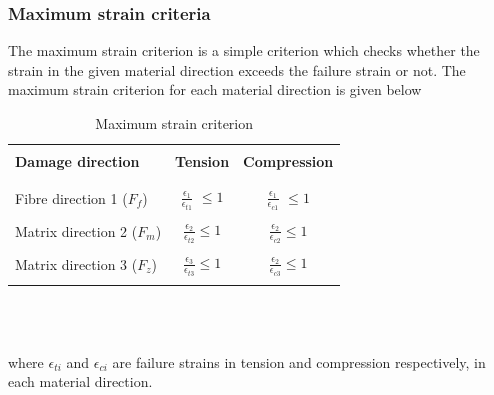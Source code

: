 \documentclass[a4paper,12pt]{extarticle}
\begin{document}
\subsubsection{Maximum strain criteria}
\indent\indent\indent The maximum strain criterion is a simple criterion which checks whether the strain in the given material direction exceeds the failure strain or not. The maximum strain criterion for each material direction is given below\\
\begin{table}[htbp]
  \begin{center}
     \begin{tabular}{l  c  c} 
     \hline
     \\
      \textbf{Damage direction} \;\;& \textbf{Tension} \;& \textbf{Compression}\\
      \\
      \hline
      \\
      Fibre direction 1 ($F_{f}$) & \Large{$\frac{\epsilon_{1}}{\epsilon_{t1}} $}\small{ $\leq 1$} &  \Large{$\frac{\epsilon_{1}}{\epsilon_{c1}} $}\small{ $\leq 1$}\\
      \\
      Matrix direction 2 ($F_{m}$)  &  \Large{$\frac{\epsilon_{2}}{\epsilon_{t2}} $}\small{$\leq 1$}  & \Large{$\frac{\epsilon_{2}}{\epsilon_{c2}} $}\small{$\leq 1$}\\
      \\
      Matrix direction 3 ($F_{z}$) &  \Large{$\frac{\epsilon_{3}}{\epsilon_{t3}} $}\small{$\leq 1$}  &   \Large{$\frac{\epsilon_{2}}{\epsilon_{c3}} $}\small{$\leq 1$}\\
       \\
       \hline
    \end{tabular}
    \\
    \caption{Maximum strain criterion}
    \label{tab:Maximum strain criterion}
  \end{center}
\end{table}\\
where $\epsilon_{ti}$ and $\epsilon_{ci}$ are failure strains in tension and compression respectively, in each material direction. 
\\
\end{document}
